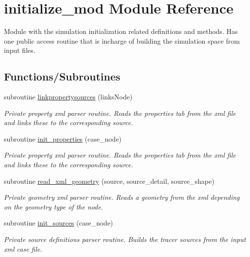 \hypertarget{namespaceinitialize__mod}{}\section{initialize\+\_\+mod Module Reference}
\label{namespaceinitialize__mod}


Module with the simulation initialization related definitions and methods. Has one public access routine that is incharge of building the simulation space from input files.  


\subsection*{Functions/\+Subroutines}
\begin{DoxyCompactItemize}
\item 
subroutine \hyperlink{namespaceinitialize__mod_af38ade977df8d56db1d125bc4cc03a4a}{linkpropertysources} (links\+Node)
\begin{DoxyCompactList}\small\item\em Private property xml parser routine. Reads the properties tab from the xml file and links these to the corresponding source. \end{DoxyCompactList}\item 
subroutine \hyperlink{namespaceinitialize__mod_a4c7a93dca8bb7b573e91f877033ab22a}{init\+\_\+properties} (case\+\_\+node)
\begin{DoxyCompactList}\small\item\em Private property xml parser routine. Reads the properties tab from the xml file and links these to the corresponding source. \end{DoxyCompactList}\item 
subroutine \hyperlink{namespaceinitialize__mod_aebe8236f74bc6665b16463683c478602}{read\+\_\+xml\+\_\+geometry} (source, source\+\_\+detail, source\+\_\+shape)
\begin{DoxyCompactList}\small\item\em Private geometry xml parser routine. Reads a geometry from the xml depending on the geometry type of the node. \end{DoxyCompactList}\item 
subroutine \hyperlink{namespaceinitialize__mod_aae6a35bca190cdf65a6146f254264cd1}{init\+\_\+sources} (case\+\_\+node)
\begin{DoxyCompactList}\small\item\em Private source definitions parser routine. Builds the tracer sources from the input xml case file. \end{DoxyCompactList}\item 

\end{DoxyCompactItemize}
